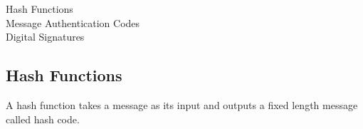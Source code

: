 \documentclass[%
  slidesonly,%
  semlayer%
  ]{seminar}                                  %
\newenvironment{defn}{\noindent \\ \noindent{\bf Defn:}}{\hspace*{\fill} \newline}
\begin{document}
\begin{slide}
  \begin{description}
    \item[Hash Functions]
    \item[Message Authentication Codes]
    \item[Digital Signatures]
  \end{description}
  \clearpage



    


  \subsection*{Hash Functions}
    A hash function takes a message as its input and outputs a fixed length message called hash code.


\end{slide}
\end{document}

